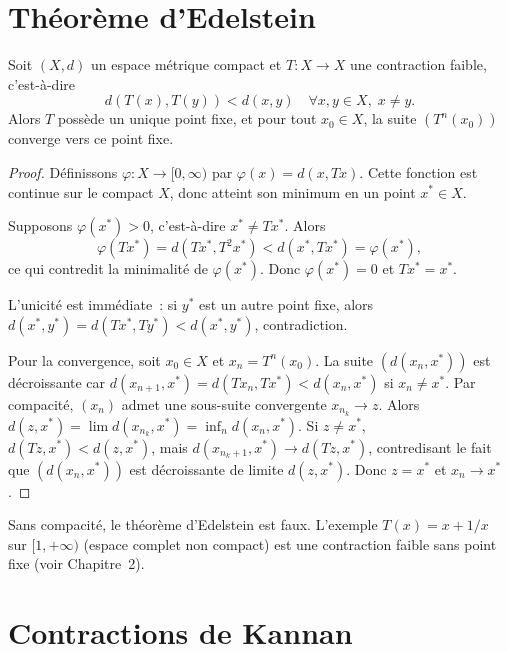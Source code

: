 \section{Th\'eor\`eme d'Edelstein}

\begin{theoreme}[Edelstein, 1962]\label{thm:edelstein}
Soit $(X, d)$ un espace m\'etrique compact et $T : X \to X$ une contraction
faible, c'est-\`a-dire
\[
    d(T(x), T(y)) < d(x, y) \quad \forall x, y \in X, \; x \neq y.
\]
Alors $T$ poss\`ede un unique point fixe, et pour tout $x_0 \in X$, la suite
$(T^n(x_0))$ converge vers ce point fixe.
\end{theoreme}

\begin{proof}
D\'efinissons $\varphi : X \to [0, \infty)$ par $\varphi(x) = d(x, Tx)$.
Cette fonction est continue sur le compact $X$, donc atteint son minimum en un
point $x^* \in X$.

Supposons $\varphi(x^*) > 0$, c'est-\`a-dire $x^* \neq Tx^*$. Alors
\[
    \varphi(Tx^*) = d(Tx^*, T^2 x^*) < d(x^*, Tx^*) = \varphi(x^*),
\]
ce qui contredit la minimalit\'e de $\varphi(x^*)$. Donc $\varphi(x^*) = 0$ et
$Tx^* = x^*$.

L'unicit\'e est imm\'ediate~: si $y^*$ est un autre point fixe, alors
$d(x^*, y^*) = d(Tx^*, Ty^*) < d(x^*, y^*)$, contradiction.

Pour la convergence, soit $x_0 \in X$ et $x_n = T^n(x_0)$. La suite
$(d(x_n, x^*))$ est d\'ecroissante car
$d(x_{n+1}, x^*) = d(Tx_n, Tx^*) < d(x_n, x^*)$ si $x_n \neq x^*$.
Par compacit\'e, $(x_n)$ admet une sous-suite convergente $x_{n_k} \to z$.
Alors $d(z, x^*) = \lim d(x_{n_k}, x^*) = \inf_n d(x_n, x^*)$. Si $z \neq x^*$,
$d(Tz, x^*) < d(z, x^*)$, mais $d(x_{n_k + 1}, x^*) \to d(Tz, x^*)$,
contredisant le fait que $(d(x_n, x^*))$ est d\'ecroissante de limite
$d(z, x^*)$. Donc $z = x^*$ et $x_n \to x^*$.
\end{proof}

\begin{attention}[title=\textbf{Compacit\'e essentielle}]
Sans compacit\'e, le th\'eor\`eme d'Edelstein est faux. L'exemple
$T(x) = x + 1/x$ sur $[1, +\infty)$ (espace complet non compact) est une
contraction faible sans point fixe (voir Chapitre~2).
\end{attention}

\section{Contractions de Kannan}

